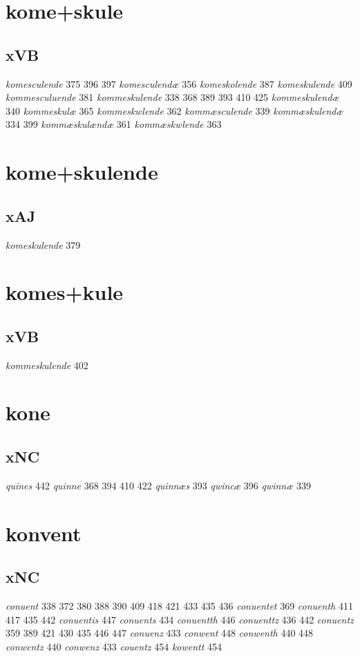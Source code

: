 \documentclass[a4paper,twocolumn]{article}
\begin{document}
\section{kome+skule}
\label{sec:org5b2fa2a}
\subsection{xVB}
\label{sec:org6fad8e2}
\emph{komesculende} 375 396 397 \emph{komesculendæ} 356 \emph{komeskolende} 387 \emph{komeskulende} 409 \emph{kommesculuende} 381 \emph{kommeskulende} 338 368 389 393 410 425 \emph{kommeskulendæ} 340 \emph{kommeskulæ} 365 \emph{kommeskwlende} 362 \emph{kommæsculende} 339 \emph{kommæskulendæ} 334 399 \emph{kommæskulændæ} 361 \emph{kommæskwlende} 363 
\section{kome+skulende}
\label{sec:org16fb96e}
\subsection{xAJ}
\label{sec:orgdf525c8}
\emph{komeskulende} 379 
\section{komes+kule}
\label{sec:orge3d3558}
\subsection{xVB}
\label{sec:org0a933ee}
\emph{kommeskulende} 402 
\section{kone}
\label{sec:orgd156264}
\subsection{xNC}
\label{sec:org0f81932}
\emph{quines} 442 \emph{quinne} 368 394 410 422 \emph{quinnæs} 393 \emph{qwincæ} 396 \emph{qwinnæ} 339 
\section{konvent}
\label{sec:org8f1a68d}
\subsection{xNC}
\label{sec:org9a90153}
\emph{conuent} 338 372 380 388 390 409 418 421 433 435 436 \emph{conuentet} 369 \emph{conuenth} 411 417 435 442 \emph{conuentis} 447 \emph{conuents} 434 \emph{conuentth} 446 \emph{conuenttz} 436 442 \emph{conuentz} 359 389 421 430 435 446 447 \emph{conuenz} 433 \emph{conwent} 448 \emph{conwenth} 440 448 \emph{conwentz} 440 \emph{conwenz} 433 \emph{couentz} 454 \emph{kowentt} 454 
\end{document}

